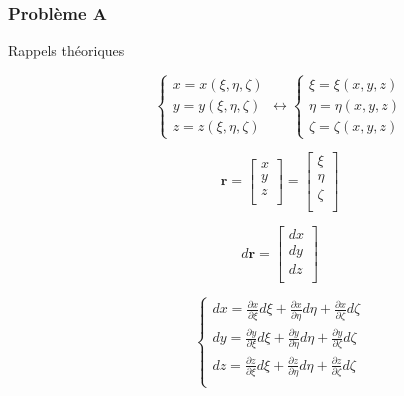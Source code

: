 \documentclass
[
a4paper,                      %
twoside,					  %
12pt,                         %
abstract,		      %
fleqn,                        %
]
{scrartcl} %
\begin{document}
\subsubsection{Probl\`eme A}

\begin{description}

\item[Rappels th\'eoriques]

\begin{equation}
\begin{cases}
x=x\left(\xi,\eta,\zeta\right)\\
y=y\left(\xi,\eta,\zeta\right)\\
z=z\left(\xi,\eta,\zeta\right)
\end{cases}\longleftrightarrow\begin{cases}
\xi=\xi\left(x,y,z\right)\\
\eta=\eta\left(x,y,z\right)\\
\zeta=\zeta\left(x,y,z\right)
\end{cases}
\end{equation}

\begin{equation}
\mathbf{r}=\begin{bmatrix}
x\\
y\\
z\\
\end{bmatrix}=\begin{bmatrix}
\xi\\
\eta\\
\zeta\\
\end{bmatrix}
\end{equation}

\begin{equation}
d\mathbf{r}=\begin{bmatrix}
dx\\
dy\\
dz\\
\end{bmatrix}
\end{equation}

\begin{equation}
\begin{cases}
dx=\frac{\partial x}{\partial\xi}d \xi+\frac{\partial x}{\partial\eta}d \eta+\frac{\partial x}{\partial\zeta}d \zeta\\
dy=\frac{\partial y}{\partial\xi}d \xi+\frac{\partial y}{\partial\eta}d \eta+\frac{\partial y}{\partial\zeta}d \zeta\\
dz=\frac{\partial z}{\partial\xi}d \xi+\frac{\partial z}{\partial\eta}d \eta+\frac{\partial z}{\partial\zeta}d \zeta\\
\end{cases}
\end{equation}


\end{description}
\end{document}

